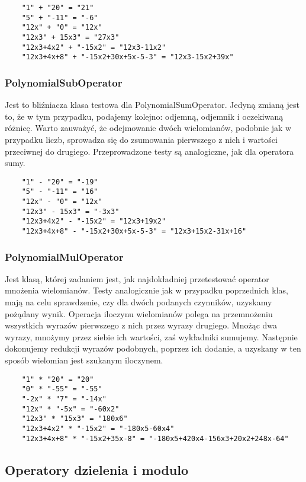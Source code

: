 \documentclass[oneside,a4paper]{book}
\begin{document}
	\begin{lstlisting}
	"1" + "20" = "21"
	"5" + "-11" = "-6"
	"12x" + "0" = "12x"
	"12x3" + 15x3" = "27x3"
	"12x3+4x2" + "-15x2" = "12x3-11x2"
	"12x3+4x+8" + "-15x2+30x+5x-5-3" = "12x3-15x2+39x"
	\end{lstlisting}
	
	\subsubsection{PolynomialSubOperator}
	
	Jest to bliźniacza klasa testowa dla PolynomialSumOperator. Jedyną zmianą jest to, że w tym przypadku, podajemy kolejno: odjemną, odjemnik i oczekiwaną różnicę. Warto zauważyć, że odejmowanie dwóch wielomianów, podobnie jak w przypadku liczb, sprowadza się do zsumowania pierwszego z nich i wartości przeciwnej do drugiego. Przeprowadzone testy są analogiczne, jak dla operatora sumy.
	
	\begin{lstlisting}
	"1" - "20" = "-19"
	"5" - "-11" = "16"
	"12x" - "0" = "12x"
	"12x3" - 15x3" = "-3x3"
	"12x3+4x2" - "-15x2" = "12x3+19x2"
	"12x3+4x+8" - "-15x2+30x+5x-5-3" = "12x3+15x2-31x+16"
	\end{lstlisting}
	
	\subsubsection{PolynomialMulOperator}
	
	Jest klasą, której zadaniem jest, jak najdokładniej przetestować operator mnożenia wielomianów. Testy analogicznie jak w przypadku poprzednich klas, mają na celu sprawdzenie, czy dla dwóch podanych czynników, uzyskamy pożądany wynik. Operacja iloczynu wielomianów polega na przemnożeniu wszystkich wyrazów pierwszego z nich przez wyrazy drugiego. Mnożąc dwa wyrazy, mnożymy przez siebie ich wartości, zaś wykładniki sumujemy. Następnie dokonujemy redukcji wyrazów podobnych, poprzez ich dodanie, a uzyskany w ten sposób wielomian jest szukanym iloczynem.
	
	\begin{lstlisting}
	"1" * "20" = "20"
	"0" * "-55" = "-55"
	"-2x" * "7" = "-14x"
	"12x" * "-5x" = "-60x2"
	"12x3" * "15x3" = "180x6"
	"12x3+4x2" * "-15x2" = "-180x5-60x4"
	"12x3+4x+8" * "-15x2+35x-8" = "-180x5+420x4-156x3+20x2+248x-64"
	\end{lstlisting}
	
	\subsection{Operatory dzielenia i modulo}
	
\end{document}
